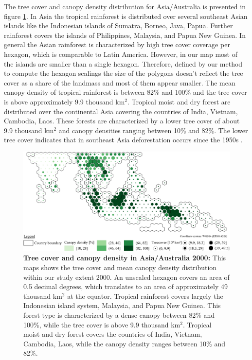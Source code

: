 			The tree cover and canopy density distribution for Asia/Australia is presented in figure \ref{fig:asia_tree_cover}. In Asia the tropical rainforest is distributed over several southeast Asian islands like the Indonesian islands of Sumatra, Borneo, Java, Papua. Further rainforest covers the islands of Philippines, Malaysia, and Papua New Guinea. In general the Asian rainforest is characterized by high tree cover coverage per hexagon, which is comparable to Latin America. However, in our map most of the islands are smaller than a single hexagon. Therefore, defined by our method to compute the hexagon scalings the size of the polygons doesn't reflect the tree cover as a share of the landmass and most of them appear smaller. The mean canopy density of tropical rainforest is between 82\% and 100\% and the tree cover is above approximately 9.9 thousand km$^2$. Tropical moist and dry forest are distributed over the continental Asia covering the countries of India, Vietnam, Cambodia, Laos. These forests are characterized by a lower tree cover of about 9.9 thousand km$^2$ and canopy densities ranging between 10\% and 82\%. The lower tree cover indicates that in southeast Asia deforestation occurs since the 1950s \citep{Kummer1994}. 
			\begin{figure}[ht]
				\centering
				\includegraphics[scale=.91]{img/asia_treecover_frameless}
				\caption[Tree cover and canopy density in Asia/Australia 2000]{\textbf{Tree cover and canopy density in Asia/Australia 2000:} This maps shows the tree cover and mean canopy density distribution within our study extent 2000. An unscaled hexagon covers an area of 0.5 decimal degrees, which translates to an area of approximately 49 thousand km$^2$ at the equator. Tropical rainforest covers largely the Indonesian island system, Malaysia, and Papua New Guinea. This forest type is characterized by a dense canopy between 82\% and 100\%, while the tree cover is above 9.9 thousand km$^2$. Tropical moist and dry forest covers the countries of India, Vietnam, Cambodia, Laos, while the canopy density ranges between 10\% and 82\%.}
				\label{fig:asia_tree_cover}
			\end{figure}


